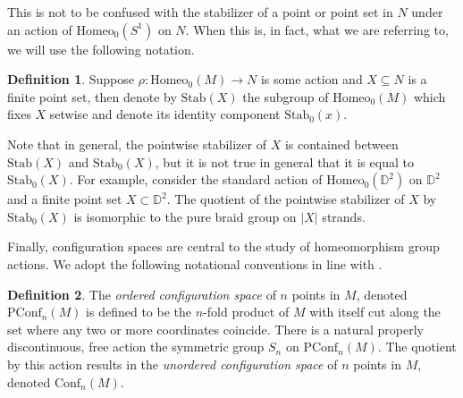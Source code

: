 \documentclass[10pt, oneside]{article}
\newcommand{\D}{\mathbb{D}}
\newcommand{\homeo}[1][S^1]{\text{Homeo}_0(#1)}
\newcommand{\conf}[2][S^1]{\text{Conf}_{#2}(#1)}
\newcommand{\pconf}[2][S^1]{\text{PConf}_{#2}(#1)}
\newcommand{\stab}[1]{\text{Stab}(#1)}
\newcommand{\pstab}[1]{\text{Stab}_0(#1)}
\theoremstyle{definition}
\newtheorem{defn}{Definition}[section]
\theoremstyle{definition}
\begin{document}
This is not to be confused with the stabilizer of a point or point set in $N$ under an action of $\homeo$ on $N$. When this is, in fact, what we are referring to, we will use the following notation.

\begin{defn}
    Suppose $\rho: \homeo[M]\to N$ is some action and $X\subseteq N$ is a finite point set, then denote by $\stab{X}$ the subgroup of $\homeo[M]$ which fixes $X$ setwise and denote its identity component $\pstab{x}$.
\end{defn}

Note that in general, the pointwise stabilizer of $X$ is contained between $\stab{X}$ and $\pstab{X}$, but it is not true in general that it is equal to $\pstab{X}$. For example, consider the standard action of $\homeo[\D^2]$ on $\D^2$ and a finite point set $X\subset \D^2$. The quotient of the pointwise stabilizer of $X$ by $\pstab{X}$ is isomorphic to the pure braid group on $|X|$ strands.

Finally, configuration spaces are central to the study of homeomorphism group actions. We adopt the following notational conventions in line with \cite{chen:StructureTheorems}.

\begin{defn}
    The {\it ordered configuration space} of $n$ points in $M$, denoted $\pconf[M]{n}$ is defined to be the $n$-fold product of $M$ with itself cut along the set where any two or more coordinates coincide. There is a natural properly discontinuous, free action the symmetric group $S_n$ on $\pconf[M]{n}$. The quotient by this action results in the {\it unordered configuration space} of $n$ points in $M$, denoted $\conf[M]{n}$.
\end{defn}
\end{document}

